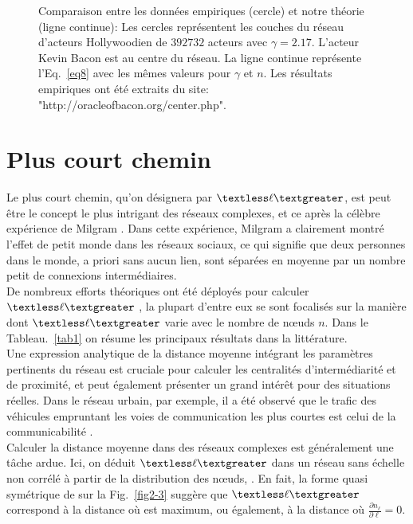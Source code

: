 \begin{figure}[h!]
	\caption{Comparaison entre les données empiriques (cercle) et notre théorie (ligne continue): Les cercles représentent les couches du réseau d’acteurs Hollywoodien de $392732$ acteurs avec $\gamma=2.17$. L'acteur Kevin Bacon est au centre du réseau. La ligne continue représente l'Eq.~\eqref{eq8} avec les mêmes valeurs pour $\gamma$ et $n$. Les résultats empiriques ont été extraits du site: "http://oracleofbacon.org/center.php".}	
	\label{couch-reel}
\end{figure}
    
\section{Plus court chemin}
Le plus court chemin, qu'on désignera par $\textless \ell \textgreater$, est peut être le concept le plus intrigant des réseaux complexes, et ce après la célèbre expérience de Milgram \cite{Mi1967}. Dans cette expérience, Milgram a clairement montré l'effet de petit monde dans les réseaux sociaux, ce qui signifie que deux personnes dans le monde, a priori sans aucun lien, sont séparées en moyenne par un nombre petit de  connexions intermédiaires.\\
De nombreux efforts théoriques ont été déployés pour calculer $\textless \ell\textgreater$ \cite{Chung-Lu2002,Do-al2003,Cohen-Havlin2003,Bollobas-Riordan2004,Fronczak-al2004,Chen-al2018,Melnik-Gleeson}, la plupart d’entre eux se sont focalisés sur la manière dont $\textless \ell \textgreater$ varie avec le nombre de nœuds $n$. Dans le Tableau.~\ref{tab1} on résume les principaux résultats dans la littérature.\\
Une expression analytique de la distance moyenne intégrant les paramètres pertinents du réseau est cruciale pour calculer les centralités d'intermédiarité et de proximité, et peut également présenter un grand intérêt pour des situations réelles. Dans le réseau urbain, par exemple, il a été observé que le trafic des véhicules empruntant les voies de communication les plus courtes est celui de la communicabilité \cite{Akbarzadeh-Estrada2018}.\\
Calculer la distance moyenne dans des réseaux complexes est généralement une tâche ardue. Ici, on déduit $\textless \ell \textgreater$ dans un réseau sans échelle non corrélé à partir de la distribution des nœuds, \nl. En fait, la forme quasi symétrique de \nl sur la Fig.~\ref{fig2-3} suggère que $\textless \ell \textgreater$  correspond à la distance où \nl est maximum, ou également, à la distance où $\frac{\partial n_{\ell}}{\partial\ell}=0$.\\ 
